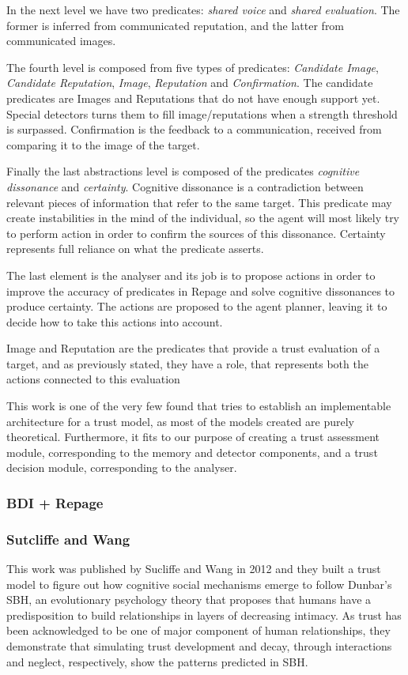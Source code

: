In the next level we have two predicates: \textit{shared voice} and \textit{shared evaluation}. The former is inferred from communicated reputation, and the latter from communicated images. 

The fourth level is composed from five types of predicates: \textit{Candidate Image}, \textit{Candidate Reputation}, \textit{Image}, \textit{Reputation} and \textit{Confirmation}. The candidate predicates are Images and Reputations that do not have enough support yet. Special detectors turns them to fill image/reputations when a strength threshold is surpassed. Confirmation is the feedback to a communication, received from comparing it to the image of the target. 

Finally the last abstractions level is composed of the predicates \textit{cognitive dissonance} and \textit{certainty}. Cognitive dissonance is a contradiction between relevant pieces of information that refer to the same target. This predicate may create instabilities in the mind of the individual, so the agent will most likely try to perform action in order to confirm the sources of this dissonance. Certainty represents full reliance on what the predicate asserts.

The last element is the analyser and its job is to propose actions in order to improve the accuracy of predicates in Repage and solve cognitive dissonances to produce certainty. The actions are proposed to the agent planner, leaving it to decide how to take this actions into account.

Image and Reputation are the predicates that provide a trust evaluation of a target, and as previously stated, they have a role, that represents both the actions connected to this evaluation 

This work is one of the very few found that tries to establish an implementable architecture for a trust model, as most of the models created are purely theoretical. Furthermore, it fits to our purpose of creating a trust assessment module, corresponding to the memory and detector components, and a trust decision module, corresponding to the analyser.


\subsubsection{BDI + Repage}
\label{subsubsec:Related work:Trust Models:BDI + Repage}

\subsubsection{Sutcliffe and Wang}
\label{subsubsec:Related work:Sutcliffe and Wang}
This work was published by Sucliffe and Wang in 2012\cite{Sutcliffe2012} and they built a trust model to figure out how cognitive social mechanisms emerge to follow Dunbar's \ac{SBH}\cite{Dunbar1998}, an evolutionary psychology theory that proposes that humans have a predisposition to build relationships in layers of decreasing intimacy. As trust has been acknowledged to be one of major component of human relationships, they demonstrate that simulating trust development and decay, through interactions and neglect, respectively, show the patterns predicted in \ac{SBH}.

